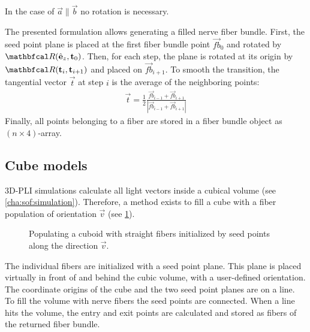 %
In the case of $\vec{a} \parallel \vec{b}$ no rotation is necessary.
\par
%
The presented formulation allows generating a filled nerve fiber bundle.
First, the seed point plane is placed at the first fiber bundle point $\vec{fb}_0$ and rotated by $\mat{R}(\hat{\vec{e}}_z, \vec{t}_0)$.
Then, for each step, the plane is rotated at its origin by $\mat{R}(\vec{t}_i, \vec{t}_{i+1})$ and placed on $\vec{fb}_{i+1}$.
To smooth the transition, the tangential vector $\vec{t}$ at step $i$ is the average of the neighboring points:
\begin{align}
    \vec{t} = \frac{1}{2} \frac{\vec{fb}_{i-1} + \vec{fb}_{i+1}}{|\vec{fb}_{i-1} + \vec{fb}_{i+1}|}
\end{align}
%
Finally, all points belonging to a fiber are stored in a fiber bundle object as $(n \times 4)$-array.
%
%
%
\subsection{Cube models} \label{sec:cubeModelBuilding}
%
\tikzset{external/export next=false}
\unskip
%
\ac{3D-PLI} simulations calculate all light vectors inside a cubical volume (see \cref{cha:sof:simulation}).
Therefore, a method exists to fill a cube with a fiber population of orientation $\vec{v}$ (see \cref{fig:cubeBuild}).
%
\begin{figure}[!t]
    \centering
    \setlength{\tikzwidth}{0.5\textwidth}
	\caption[]{Populating a cuboid with straight fibers initialized by seed points along the direction $\vec{v}$.}
    \label{fig:cubeBuild}%
\end{figure}
%
The individual fibers are initialized with a seed point plane.
This plane is placed virtually in front of and behind the cubic volume, with a user-defined orientation.
The coordinate origins of the cube and the two seed point planes are on a line.
To fill the volume with nerve fibers the seed points are connected.
When a line hits the volume, the entry and exit points are calculated and stored as fibers of the returned fiber bundle.
%
%
%

